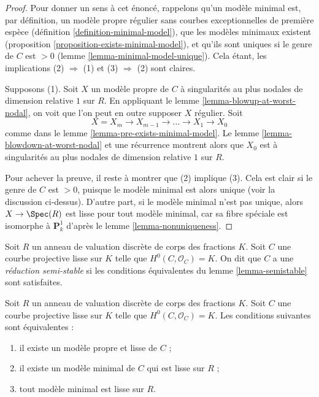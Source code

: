 \begin{proof}
Pour donner un sens à cet énoncé, rappelons qu'un modèle minimal est, par
définition, un modèle propre régulier sans courbes exceptionnelles de
première espèce (définition \ref{definition-minimal-model}), que les modèles
minimaux existent (proposition \ref{proposition-exists-minimal-model}), et
qu'ils sont uniques si le genre de $C$ est $>0$ (lemme
\ref{lemma-minimal-model-unique}). Cela étant, les implications
(2) $\Rightarrow$ (1) et (3) $\Rightarrow$ (2) sont claires.

\medskip\noindent
Supposons (1). Soit $X$ un modèle propre de $C$ à singularités au plus
nodales de dimension relative $1$ sur $R$. En appliquant le lemme
\ref{lemma-blowup-at-worst-nodal}, on voit que l'on peut en outre supposer
$X$ régulier. Soit
$$
X = X_m \to X_{m - 1} \to \ldots \to X_1 \to X_0
$$
comme dans le lemme \ref{lemma-pre-exists-minimal-model}. Le lemme
\ref{lemma-blowdown-at-worst-nodal} et une récurrence montrent alors que
$X_0$ est à singularités au plus nodales de dimension relative $1$ sur
$R$.

\medskip\noindent
Pour achever la preuve, il reste à montrer que (2) implique (3). Cela est
clair si le genre de $C$ est $>0$, puisque le modèle minimal est alors
unique (voir la discussion ci-dessus). D'autre part, si le modèle minimal
n'est pas unique, alors $X\to\Spec(R)$ est lisse pour tout modèle minimal,
car sa fibre spéciale est isomorphe à $\mathbf{P}^1_k$ d'après le lemme
\ref{lemma-nonuniqueness}.
\end{proof}

\begin{definition}
\label{definition-semistable}
Soit $R$ un anneau de valuation discrète de corps des fractions $K$.
Soit $C$ une courbe projective lisse sur $K$ telle que
$H^0(C,\mathcal{O}_C)=K$. On dit que $C$ a une
{\it réduction semi-stable} si les conditions équivalentes du lemme
\ref{lemma-semistable} sont satisfaites.
\end{definition}

\begin{lemma}
\label{lemma-good}
Soit $R$ un anneau de valuation discrète de corps des fractions $K$.
Soit $C$ une courbe projective lisse sur $K$ telle que
$H^0(C,\mathcal{O}_C)=K$. Les conditions suivantes sont équivalentes :
\begin{enumerate}
\item il existe un modèle propre et lisse de $C$ ;
\item il existe un modèle minimal de $C$ qui est lisse sur $R$ ;
\item tout modèle minimal est lisse sur $R$.
\end{enumerate}
\end{lemma}

